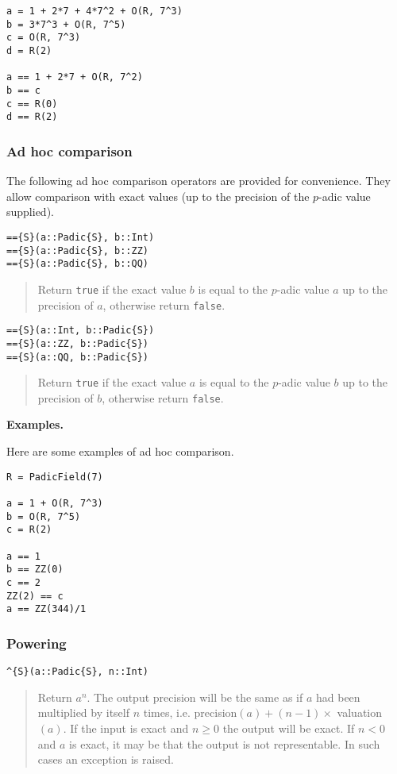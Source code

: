 \documentclass[a4paper,10pt]{article}
\newcommand{\code}{\lstinline}
\newcommand{\desc}[1]{\vspace{-3mm}\begin{quote}#1\end{quote}}
\begin{document}
{{{\begin{lstlisting}
a = 1 + 2*7 + 4*7^2 + O(R, 7^3)
b = 3*7^3 + O(R, 7^5)
c = O(R, 7^3)
d = R(2)

a == 1 + 2*7 + O(R, 7^2)
b == c
c == R(0)
d == R(2)
\end{lstlisting}

\subsubsection{Ad hoc comparison}

The following ad hoc comparison operators are provided for convenience. They
allow comparison with exact values (up to the precision of the $p$-adic value
supplied).

\begin{lstlisting}
=={S}(a::Padic{S}, b::Int)
=={S}(a::Padic{S}, b::ZZ)
=={S}(a::Padic{S}, b::QQ)
\end{lstlisting}

\desc{Return \code{true} if the exact value $b$ is equal to the $p$-adic 
value $a$ up to the precision of $a$, otherwise return \code{false}.}

\begin{lstlisting}
=={S}(a::Int, b::Padic{S})
=={S}(a::ZZ, b::Padic{S})
=={S}(a::QQ, b::Padic{S})
\end{lstlisting}

\desc{Return \code{true} if the exact value $a$ is equal to the $p$-adic 
value $b$ up to the precision of $b$, otherwise return \code{false}.}

\textbf{Examples.}

Here are some examples of ad hoc comparison.

\begin{lstlisting}
R = PadicField(7)

a = 1 + O(R, 7^3)
b = O(R, 7^5)
c = R(2)

a == 1
b == ZZ(0)
c == 2
ZZ(2) == c
a == ZZ(344)/1
\end{lstlisting}

\subsubsection{Powering}

\begin{lstlisting}
^{S}(a::Padic{S}, n::Int)
\end{lstlisting}

\desc{Return $a^n$. The output precision will be the same as if $a$ had been
multiplied by itself $n$ times, i.e. precision$(a) + (n - 1)\times$
valuation$(a)$. If the input is exact and $n \geq 0$ the output will be
exact. If $n < 0$ and $a$ is exact, it may be that the output is not
representable. In such cases an exception is raised.}

}}}
\end{document}
